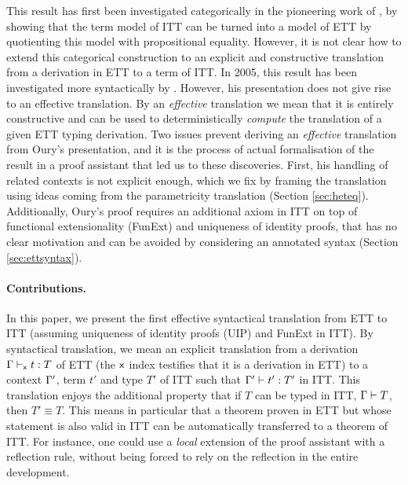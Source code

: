 This result has first been investigated categorically in the
pioneering work of \cite{hofmann1995conservativity,HofmannPhD},
%
by showing that the term model of ITT can be turned into a model of ETT by
quotienting this model with propositional equality.
%
However, it is not clear how to extend this categorical construction
to an explicit and constructive translation from a derivation in ETT to
a term of ITT.
%
In 2005, this result has been investigated more syntactically by
\cite{oury2005extensionality}. However, his presentation does not give
rise to an effective translation.
%
By an \emph{effective} translation we mean that it is entirely
constructive and can be used to deterministically \emph{compute} the
translation of a given ETT typing derivation.
%
Two issues prevent deriving an \emph{effective} translation from Oury's
presentation, and it is the process of actual formalisation of the
result in a proof assistant that led us to these discoveries. First, his
handling of related contexts is not explicit enough, which we fix by
framing the translation using ideas coming from the parametricity
translation (Section \ref{sec:heteq}). Additionally, Oury's proof
requires an additional axiom in ITT on top of functional
extensionality (FunExt)
and uniqueness of identity proofs, that has no clear motivation and can
be avoided by considering an annotated syntax (Section
\ref{sec:ettsyntax}).

\paragraph*{Contributions.}
In this paper, we present the first effective syntactical translation
from ETT to ITT (assuming uniqueness of identity proofs (UIP) and
FunExt in ITT).
%
By syntactical translation, we mean an explicit translation from a
derivation $\Gamma \vdash_{\mathsf{x}} t : T$ of ETT (the $\mathsf{x}$ index testifies that it
is a derivation in ETT) to a context $\Gamma'$, term
$t'$ and type $T'$ of ITT such that $\Gamma' \vdash t' : T'$ in ITT.
%
This translation enjoys the additional property that if $T$ can be
typed in ITT, \ie $\Gamma \vdash T$, then $T' \equiv T$.
%
This means in particular that a theorem proven in ETT but whose
statement is also valid in ITT can be automatically transferred to a theorem
of ITT. For instance, one could use a \emph{local} extension of the
\Coq proof assistant with a reflection rule, without being forced to rely on
the reflection in the entire development.

